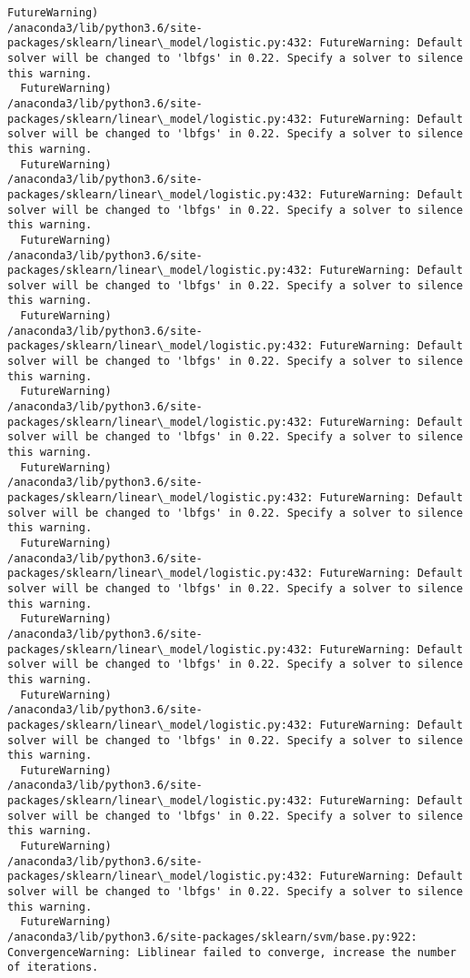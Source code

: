 \documentclass[11pt]{article}
\begin{document}
\begin{Verbatim}[commandchars=\\\{\}]
  FutureWarning)
/anaconda3/lib/python3.6/site-packages/sklearn/linear\_model/logistic.py:432: FutureWarning: Default solver will be changed to 'lbfgs' in 0.22. Specify a solver to silence this warning.
  FutureWarning)
/anaconda3/lib/python3.6/site-packages/sklearn/linear\_model/logistic.py:432: FutureWarning: Default solver will be changed to 'lbfgs' in 0.22. Specify a solver to silence this warning.
  FutureWarning)
/anaconda3/lib/python3.6/site-packages/sklearn/linear\_model/logistic.py:432: FutureWarning: Default solver will be changed to 'lbfgs' in 0.22. Specify a solver to silence this warning.
  FutureWarning)
/anaconda3/lib/python3.6/site-packages/sklearn/linear\_model/logistic.py:432: FutureWarning: Default solver will be changed to 'lbfgs' in 0.22. Specify a solver to silence this warning.
  FutureWarning)
/anaconda3/lib/python3.6/site-packages/sklearn/linear\_model/logistic.py:432: FutureWarning: Default solver will be changed to 'lbfgs' in 0.22. Specify a solver to silence this warning.
  FutureWarning)
/anaconda3/lib/python3.6/site-packages/sklearn/linear\_model/logistic.py:432: FutureWarning: Default solver will be changed to 'lbfgs' in 0.22. Specify a solver to silence this warning.
  FutureWarning)
/anaconda3/lib/python3.6/site-packages/sklearn/linear\_model/logistic.py:432: FutureWarning: Default solver will be changed to 'lbfgs' in 0.22. Specify a solver to silence this warning.
  FutureWarning)
/anaconda3/lib/python3.6/site-packages/sklearn/linear\_model/logistic.py:432: FutureWarning: Default solver will be changed to 'lbfgs' in 0.22. Specify a solver to silence this warning.
  FutureWarning)
/anaconda3/lib/python3.6/site-packages/sklearn/linear\_model/logistic.py:432: FutureWarning: Default solver will be changed to 'lbfgs' in 0.22. Specify a solver to silence this warning.
  FutureWarning)
/anaconda3/lib/python3.6/site-packages/sklearn/linear\_model/logistic.py:432: FutureWarning: Default solver will be changed to 'lbfgs' in 0.22. Specify a solver to silence this warning.
  FutureWarning)
/anaconda3/lib/python3.6/site-packages/sklearn/linear\_model/logistic.py:432: FutureWarning: Default solver will be changed to 'lbfgs' in 0.22. Specify a solver to silence this warning.
  FutureWarning)
/anaconda3/lib/python3.6/site-packages/sklearn/linear\_model/logistic.py:432: FutureWarning: Default solver will be changed to 'lbfgs' in 0.22. Specify a solver to silence this warning.
  FutureWarning)
/anaconda3/lib/python3.6/site-packages/sklearn/svm/base.py:922: ConvergenceWarning: Liblinear failed to converge, increase the number of iterations.

\end{Verbatim}
\end{document}
